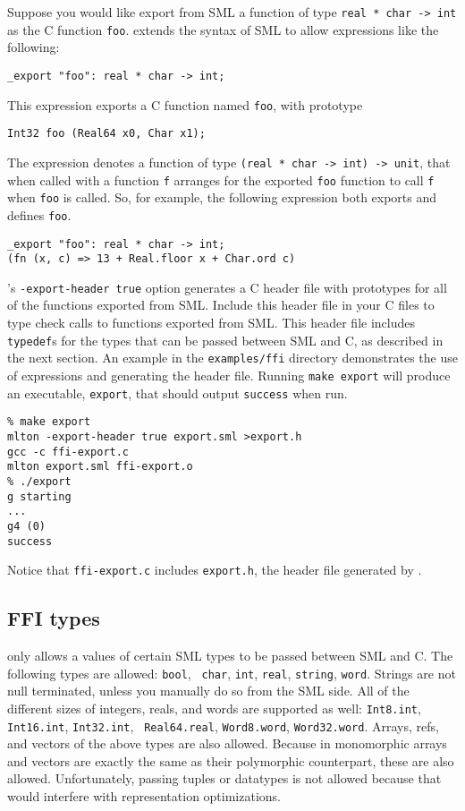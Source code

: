 Suppose you would like export from SML a function of type {\tt real *
char -> int} as the C function {\tt foo}.  {\mlton} extends the syntax
of SML to allow expressions like the following:
\begin{verbatim}
_export "foo": real * char -> int;
\end{verbatim}
This expression exports a C function named {\tt foo}, with prototype
\begin{verbatim}
Int32 foo (Real64 x0, Char x1);
\end{verbatim}
The {\export} expression denotes a function of type {\tt (real * char
-> int) -> unit}, that when called with a function {\tt f} arranges
for the exported {\tt foo} function to call {\tt f} when {\tt foo} is
called.  So, for example, the following expression both exports and
defines {\tt foo}.
\begin{verbatim}
_export "foo": real * char -> int;
(fn (x, c) => 13 + Real.floor x + Char.ord c)
\end{verbatim}

{\mlton}'s {\tt -export-header true} option generates a C header file
with prototypes for all of the functions exported from SML.  Include
this header file in your C files to type check calls to functions
exported from SML.  This header file includes {\tt typedef}s for the
types that can be passed between SML and C, as described in the next
section.  An example in the {\tt examples/ffi} directory demonstrates
the use of {\export} expressions and generating the header file.
Running {\tt make export} will produce an executable, {\tt export},
that should output {\tt success} when run.

\begin{verbatim}
% make export
mlton -export-header true export.sml >export.h
gcc -c ffi-export.c
mlton export.sml ffi-export.o
% ./export
g starting
...
g4 (0)
success
\end{verbatim}

Notice that {\tt ffi-export.c} includes {\tt export.h}, the header
file generated by {\mlton}.

\subsection{FFI types}

{\mlton} only allows a values of certain SML types to be passed
between SML and C.  The following types are allowed: {\tt bool}, {\tt
char}, {\tt int}, {\tt real}, {\tt string}, {\tt word}.  Strings are
not null terminated, unless you manually do so from the SML side.  All
of the different sizes of integers, reals, and words are supported as
well: {\tt Int8.int}, {\tt Int16.int}, {\tt Int32.int}, {\tt
Real64.real}, {\tt Word8.word}, {\tt Word32.word}.  Arrays, refs, and
vectors of the above types are also allowed.  Because in {\mlton}
monomorphic arrays and vectors are exactly the same as their
polymorphic counterpart, these are also allowed.  Unfortunately,
passing tuples or datatypes is not allowed because that would
interfere with representation optimizations.

